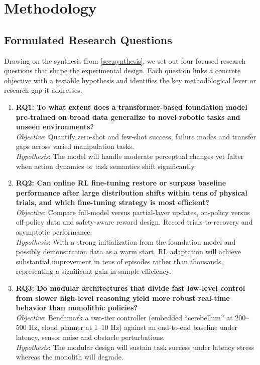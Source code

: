 \chapter{Methodology}
\label{sec:method}

\section{Formulated Research Questions}
\label{sec:rqs}

Drawing on the synthesis from \cref{sec:synthesis}, we set out four focused research questions that shape the experimental design. Each question links a concrete objective with a testable hypothesis and identifies the key methodological lever or research gap it addresses.

\begin{enumerate}
    \item \textbf{RQ1: To what extent does a transformer-based foundation model pre-trained on broad data generalize to novel robotic tasks and unseen environments?}\\[2pt]
    \textit{Objective}: Quantify zero-shot and few-shot success, failure modes and transfer gaps across varied manipulation tasks.\\[2pt]
    \textit{Hypothesis}: The model will handle moderate perceptual changes yet falter when action dynamics or task semantics shift significantly.

    \item \textbf{RQ2: Can online \ac{RL} fine-tuning restore or surpass baseline performance after large distribution shifts within tens of physical trials, and which fine-tuning strategy is most efficient?}\\[2pt]
    \textit{Objective}: Compare full-model versus partial-layer updates, on-policy versus off-policy data and safety-aware reward design. Record trials-to-recovery and asymptotic performance.\\[2pt]
    \textit{Hypothesis}: With a strong initialization from the foundation model and possibly demonstration data as a warm start, \ac{RL} adaptation will achieve substantial improvement in tens of episodes rather than thousands, representing a significant gain in sample efficiency.

    \item \textbf{RQ3: Do modular architectures that divide fast low-level control from slower high-level reasoning yield more robust real-time behavior than monolithic policies?}\\[2pt]
    \textit{Objective}: Benchmark a two-tier controller (embedded ``cerebellum'' at 200–500 Hz, cloud planner at 1–10 Hz) against an end-to-end baseline under latency, sensor noise and obstacle perturbations.\\[2pt]
    \textit{Hypothesis}: The modular design will sustain task success under latency stress whereas the monolith will degrade.


\end{enumerate}
